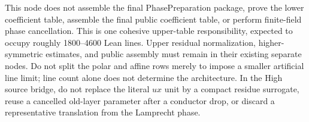\begin{lemma}
This node does not assemble the final PhasePreparation package, prove the
lower coefficient table, assemble the final public coefficient table, or
perform finite-field phase cancellation.
\leanok
{}
\FormalizationContract
This is one cohesive upper-table responsibility, expected to occupy roughly
1800--4600 Lean lines.  Upper residual normalization, higher-symmetric
estimates, and public assembly must remain in their existing separate nodes.
Do not split the polar and affine rows merely to impose a smaller artificial
line limit; line count alone does not determine the architecture.  In the
High source bridge, do not replace the literal $ux$ unit by a compact residue
surrogate, reuse a cancelled old-layer parameter after a conductor drop, or
discard a representative translation from the Lamprecht phase.
\end{lemma}
